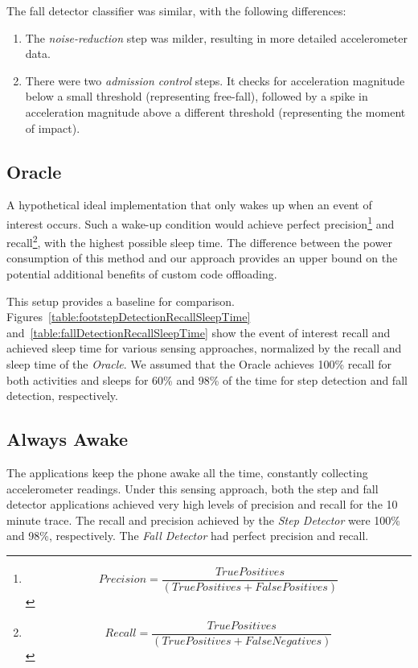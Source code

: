 The fall detector classifier was similar, with the following differences:

\begin{enumerate}
\setlength{\itemsep}{-3pt}  

\item The {\em noise-reduction} step was milder, resulting in more detailed accelerometer data.

\item There were two {\em admission control} steps.  It checks for acceleration magnitude 
  below a small threshold (representing free-fall), followed by a spike in acceleration magnitude 
  above a different threshold (representing the moment of impact).

\end{enumerate}

\subsection{Oracle}

A hypothetical ideal implementation that only wakes up
when an event of interest occurs.  Such a wake-up condition would
achieve perfect precision\footnote{$$Precision=\frac{True Positives}{(True Positives + False Positives)}$$}
and recall\footnote{$$Recall=\frac{True Positives}{(True Positives + False Negatives)}$$}, with
the highest possible sleep time. The difference between the
power consumption of this method and our approach
provides an upper bound on the potential additional benefits of custom
code offloading.

This setup provides a baseline for comparison. Figures~\ref{table:footstepDetectionRecallSleepTime} 
and~\ref{table:fallDetectionRecallSleepTime} show the event of interest recall and achieved sleep time
for various sensing approaches, normalized by the recall and sleep time of the {\em Oracle}. 
We assumed that the Oracle achieves 100\% recall for both activities and sleeps for 60\% and 98\% of
the time for step detection and fall detection, respectively.

\subsection{Always Awake} 

The applications keep the phone awake all the time, constantly collecting accelerometer readings.  Under 
this sensing approach, both the step and fall detector applications
achieved very high levels of precision and recall for the 10 minute trace. The recall 
and precision achieved by the {\em Step Detector} were 100\% and 98\%, respectively. The {\em Fall Detector}
had perfect precision and recall.


